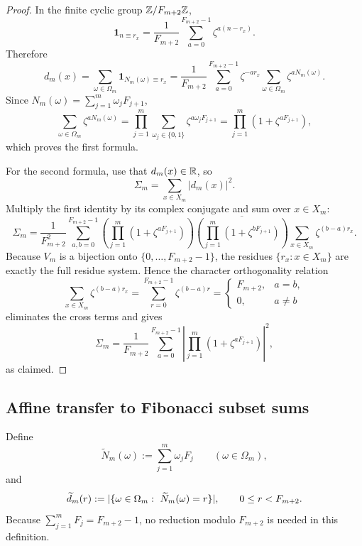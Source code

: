 \begin{proof}
In the finite cyclic group \(\mathbb{Z}/F_{m+2}\mathbb{Z}\),
\[
  \mathbf{1}_{n\equiv r_x}
  =
  \frac{1}{F_{m+2}}
  \sum_{a=0}^{F_{m+2}-1}\zeta^{a(n-r_x)}.
\]
Therefore
\[
  d_m(x)
  =
  \sum_{\omega\in\Omega_m}\mathbf{1}_{N_m(\omega)\equiv r_x}
  =
  \frac{1}{F_{m+2}}
  \sum_{a=0}^{F_{m+2}-1}
  \zeta^{-ar_x}
  \sum_{\omega\in\Omega_m}\zeta^{aN_m(\omega)}.
\]
Since \(N_m(\omega)=\sum_{j=1}^m \omega_jF_{j+1}\),
\[
  \sum_{\omega\in\Omega_m}\zeta^{aN_m(\omega)}
  =
  \prod_{j=1}^m\sum_{\omega_j\in\{0,1\}}\zeta^{a\omega_jF_{j+1}}
  =
  \prod_{j=1}^m(1+\zeta^{aF_{j+1}}),
\]
which proves the first formula.

For the second formula, use that \(d_m(x)\in\mathbb{R}\), so
\[
  \Sigma_m=\sum_{x\in X_m}|d_m(x)|^2 .
\]
Multiply the first identity by its complex conjugate and sum over \(x\in X_m\):
\[
  \Sigma_m
  =
  \frac{1}{F_{m+2}^2}
  \sum_{a,b=0}^{F_{m+2}-1}
  \left(
    \prod_{j=1}^m(1+\zeta^{aF_{j+1}})
  \right)
  \overline{
    \left(
      \prod_{j=1}^m(1+\zeta^{bF_{j+1}})
    \right)
  }
  \sum_{x\in X_m}\zeta^{(b-a)r_x}.
\]
Because \(V_m\) is a bijection onto \(\{0,\dots,F_{m+2}-1\}\), the residues
\(\{r_x:x\in X_m\}\) are exactly the full residue system.  Hence the character
orthogonality relation
\[
  \sum_{x\in X_m}\zeta^{(b-a)r_x}
  =
  \sum_{r=0}^{F_{m+2}-1}\zeta^{(b-a)r}
  =
  \begin{cases}
    F_{m+2}, & a=b,\\
    0, & a\neq b
  \end{cases}
\]
eliminates the cross terms and gives
\[
  \Sigma_m
  =
  \frac{1}{F_{m+2}}
  \sum_{a=0}^{F_{m+2}-1}
  \left|
    \prod_{j=1}^m(1+\zeta^{aF_{j+1}})
  \right|^2,
\]
as claimed.
\end{proof}

\subsection{Affine transfer to Fibonacci subset sums}

\begin{definition}
\label{def:shifted-spectrum}
Define
\[
  \widetilde N_m(\omega):=\sum_{j=1}^m \omega_jF_j
  \qquad (\omega\in\Omega_m),
\]
and
\[
  \widetilde d_m(r):=
  \lvert \{\omega\in\Omega_m:\ \widetilde N_m(\omega)=r\} \rvert,
  \qquad 0\le r<F_{m+2}.
\]
Because \(\sum_{j=1}^m F_j=F_{m+2}-1\), no reduction modulo \(F_{m+2}\) is
needed in this definition.
\end{definition}

